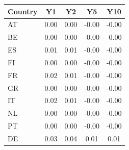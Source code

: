 \begin{tabular}{lcccc}
\toprule
Country & Y1 & Y2 & Y5 & Y10 \\
\midrule
AT & 0.00 & 0.00 & -0.00 & -0.00 \\
BE & 0.00 & 0.00 & -0.00 & -0.00 \\
ES & 0.01 & 0.01 & -0.00 & -0.00 \\
FI & 0.00 & 0.00 & -0.00 & -0.00 \\
FR & 0.02 & 0.01 & -0.00 & -0.00 \\
GR & 0.00 & 0.00 & -0.00 & -0.00 \\
IT & 0.02 & 0.01 & -0.00 & -0.00 \\
NL & 0.00 & 0.00 & -0.00 & -0.00 \\
PT & 0.00 & 0.00 & -0.00 & -0.00 \\
DE & 0.03 & 0.04 & 0.01 & 0.01 \\
\bottomrule
\end{tabular}
